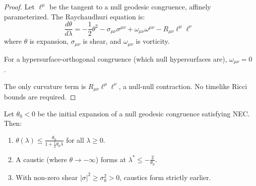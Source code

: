 \begin{proof}
Let $\ell^\mu$ be the tangent to a null geodesic congruence, affinely parameterized. The Raychaudhuri equation is:
\begin{equation}
    \frac{d\theta}{d\lambda} = -\frac{1}{2}\theta^2 - \sigma_{\mu\nu}\sigma^{\mu\nu} + \omega_{\mu\nu}\omega^{\mu\nu} - R_{\mu\nu}\ell^\mu\ell^\nu
\end{equation}
where $\theta$ is expansion, $\sigma_{\mu\nu}$ is shear, and $\omega_{\mu\nu}$ is vorticity.

For a hypersurface-orthogonal congruence (which null hypersurfaces are), $\omega_{\mu\nu} = 0$.

The only curvature term is $R_{\mu\nu}\ell^\mu\ell^\nu$, a null-null contraction. No timelike Ricci bounds are required.
\end{proof}

\begin{proposition}\label{prop:QuantFocus}
Let $\theta_0 < 0$ be the initial expansion of a null geodesic congruence satisfying NEC. Then:
\begin{enumerate}
    \item $\theta(\lambda) \leq \frac{\theta_0}{1 + \frac{1}{2}\theta_0\lambda}$ for all $\lambda \geq 0$.
    \item A caustic (where $\theta \to -\infty$) forms at $\lambda^* \leq -\frac{2}{\theta_0}$.
    \item With non-zero shear $|\sigma|^2 \geq \sigma_0^2 > 0$, caustics form strictly earlier.
\end{enumerate}
\end{proposition}

